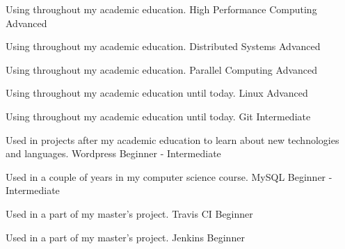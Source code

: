\begin{cventries}

  \cventry
  {Using throughout my academic education.}
  {High Performance Computing}
  {Advanced}
  {}
  {}

  \cventry
  {Using throughout my academic education.}
  {Distributed Systems}
  {Advanced}
  {}
  {}

  \cventry
  {Using throughout my academic education.}
  {Parallel Computing}
  {Advanced}
  {}
  {}

  \cventry
  {Using throughout my academic education until today.}
  {Linux}
  {Advanced}
  {}
  {}

  \cventry
  {Using throughout my academic education until today.}
  {Git}
  {Intermediate}
  {}
  {}

  \cventry
  {Used in projects after my academic education to learn about new technologies and
  languages.}
  {Wordpress} %
  {Beginner - Intermediate} %
  {}
  {}

  \cventry
  {Used in a couple of years in my computer science course.}
  {MySQL} %
  {Beginner - Intermediate} %
  {}
  {}

  \cventry
  {Used in a part of my master's project.}
  {Travis CI} %
  {Beginner} %
  {}
  {}

  \cventry
  {Used in a part of my master's project.}
  {Jenkins} %
  {Beginner} %
  {}
  {}

\end{cventries}
